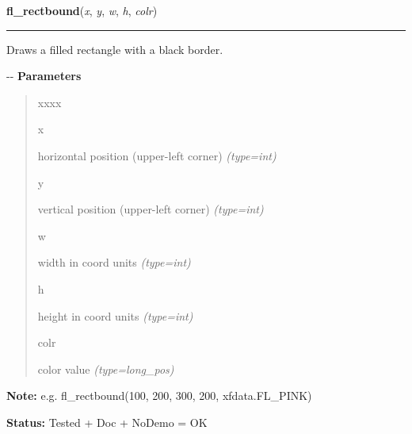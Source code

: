     \label{xformslib:flxbasic:fl_rectbound}

    \vspace{0.5ex}

\hspace{.8\funcindent}\begin{boxedminipage}{\funcwidth}

    \raggedright \textbf{fl\_rectbound}(\textit{x}, \textit{y}, \textit{w}, \textit{h}, \textit{colr})

    \vspace{-1.5ex}

    \rule{\textwidth}{0.5\fboxrule}
\setlength{\parskip}{2ex}

Draws a filled rectangle with a black border.

-{}-
\setlength{\parskip}{1ex}
      \textbf{Parameters}
      \vspace{-1ex}

      \begin{quote}
        \begin{Ventry}{xxxx}

          \item[x]


horizontal position (upper-left corner)
            {\it (type=int)}

          \item[y]


vertical position (upper-left corner)
            {\it (type=int)}

          \item[w]


width in coord units
            {\it (type=int)}

          \item[h]


height in coord units
            {\it (type=int)}

          \item[colr]


color value
            {\it (type=long\_pos)}

        \end{Ventry}

      \end{quote}

\textbf{Note:} 
e.g. fl\_rectbound(100, 200, 300, 200, xfdata.FL\_PINK)


\textbf{Status:} 
Tested + Doc + NoDemo = OK


    \end{boxedminipage}

